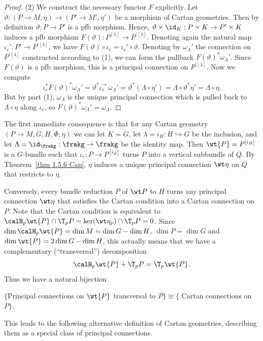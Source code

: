 \begin{proof}
    (2) We construct the necessary functor $F$ explicitly. Let $\vartheta:(P\to M,\eta)\to (P'\to M',\eta')$ be a morphism of Cartan geometries. Then by definition $\vartheta:P\to P'$ is a \gls{pfb} morphism. Hence, $\vartheta\times\id_K:P\times K\to P'\times K$ induces a \gls{pfb} morphism $F(\vartheta):P^{[\lambda]}\to P^{\prime[\lambda]}$. Denoting again the natural map $\iota_e':P'\to P^{\prime[\lambda]}$, we have $F(\vartheta)\circ\iota_e=\iota_e'\circ \vartheta$. Denoting by $\omega_\Lambda'$ the connection on $P^{\prime[\lambda]}$ constructed according to (1), we can form the pullback $F(\vartheta)^\ast \omega_\Lambda'$. Since $F(\vartheta)$ is a \gls{pfb} morphism, this is a principal connection on $P^{\prime[\lambda]}$. Now we compute 
    \[\iota_e^\ast F(\vartheta)^\ast\omega_\Lambda'=\vartheta^\ast\iota_e^{\prime\ast}\omega_\Lambda'=\vartheta^\ast(\Lambda\circ\eta')=\Lambda\circ\vartheta^\ast\eta'=\Lambda\circ\eta.\]
    But by part (1), $\omega_\Lambda$ is the unique principal connection which is pulled back to $\Lambda\circ\eta$ along $\iota_e$, so $F(\vartheta)^\ast \omega_\Lambda'=\omega_\Lambda$.
\end{proof}


The first immediate consequence is that for any Cartan geometry $(P\to M,G,H,\Phi,\eta)$ we can let $K=G$, let $\lambda=i_H:H\hookrightarrow G$ be the inclusion, and let $\Lambda=\id_\frakg:\frakg\to\frakg$ be the identity map. Then $\wt{P}=P^{[i_H]}$ is a $G$-bundle such that $\iota_e:P\to P^{[i_H]}$ turns $P$ into a vertical subbundle of $Q$. By Theorem~\ref{thm 1.5.6 Cap}, $\eta$ induces a unique principal connection $\wt\eta$ on $Q$ that restricts to $\eta$.

Conversely, every bundle reduction $P$ of $\wt P$ to $H$ turns any principal connection $\wt\eta$ that satisfies the Cartan condition into a Cartan connection on $P$. Note that the Cartan condition is equivalent to $\calH_p \wt{P}\cap \T_p P=\ker(\wt\eta_p)\cap \T_pP=0$. Since $\dim \calH_p \wt{P}=\dim M=\dim G-\dim H$, $\dim P=\dim G$ and $\dim \wt{P}=2\dim G-\dim H$, this actually means that we have a complementary (``transversal'') decomposition 
\[\calH_p \wt{P}\dotplus \T_p P=\T_p\wt{P}.\] Thus we have a natural bijection 
\begin{center}
    $\{$Principal connections on $\wt{P}$  transversal to $P\}\cong \{$ Cartan connections on $P\}$.
\end{center}
This leads to the following alternative definition of Cartan geometries, describing them as a special class of principal connections.

